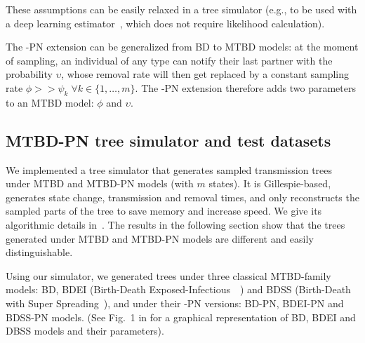 \documentclass[10pt,letterpaper]{article}
\begin{document}
These assumptions can be easily relaxed in a tree simulator (e.g., to be used with a deep learning estimator~\cite{Voznica2021}, which does not require likelihood calculation).


The -PN extension can be generalized from BD to MTBD models: at the moment of sampling, an individual of any type can notify their last partner with the probability $\upsilon$, whose removal rate will then get replaced by  a constant sampling rate $\phi >> \psi_k \; \forall k \in \{1, \ldots, m\}$. The -PN extension therefore adds two parameters to an MTBD model: $\phi$ and $\upsilon$.

\subsection*{MTBD-PN tree simulator and test datasets}\label{sec:sim}

We implemented a tree simulator that generates sampled transmission trees under MTBD and MTBD-PN models (with $m$ states). It is Gillespie-based, generates state change, transmission and removal times, and only reconstructs the sampled parts of the tree to save memory and increase speed.
We give its algorithmic details in~. The results in the following section show that the trees generated under MTBD and MTBD-PN models are different and easily distinguishable.

Using our simulator, we generated trees under three classical MTBD-family models: BD, BDEI (Birth-Death Exposed-Infectious~~\cite{Stadler2014}) and BDSS (Birth-Death with Super Spreading~\cite{Stadler2013a}), and under their -PN versions: BD-PN, BDEI-PN and BDSS-PN models. (See Fig.~1 in \cite{Voznica2021} for a graphical representation of BD, BDEI and DBSS models and their parameters).
\end{document}
